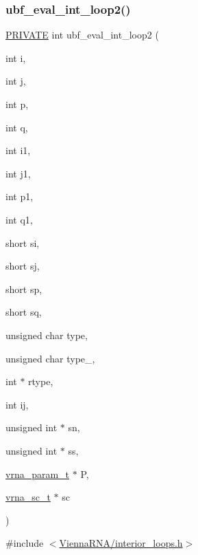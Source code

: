\subsubsection{\texorpdfstring{ubf\+\_\+eval\+\_\+int\+\_\+loop2()}{ubf\_eval\_int\_loop2()}}
{\footnotesize\ttfamily \mbox{\hyperlink{group__utils_ga5e151c615eda34903514212f05a5ccf8}{P\+R\+I\+V\+A\+TE}} int ubf\+\_\+eval\+\_\+int\+\_\+loop2 (\begin{DoxyParamCaption}\item[{int}]{i,  }\item[{int}]{j,  }\item[{int}]{p,  }\item[{int}]{q,  }\item[{int}]{i1,  }\item[{int}]{j1,  }\item[{int}]{p1,  }\item[{int}]{q1,  }\item[{short}]{si,  }\item[{short}]{sj,  }\item[{short}]{sp,  }\item[{short}]{sq,  }\item[{unsigned char}]{type,  }\item[{unsigned char}]{type\+\_,  }\item[{int $\ast$}]{rtype,  }\item[{int}]{ij,  }\item[{unsigned int $\ast$}]{sn,  }\item[{unsigned int $\ast$}]{ss,  }\item[{\mbox{\hyperlink{group__energy__parameters_ga8a69ca7d787e4fd6079914f5343a1f35}{vrna\+\_\+param\+\_\+t}} $\ast$}]{P,  }\item[{\mbox{\hyperlink{group__soft__constraints_ga75401ce219ef8dbcceb672db82d434c6}{vrna\+\_\+sc\+\_\+t}} $\ast$}]{sc }\end{DoxyParamCaption})}



{\ttfamily \#include $<$\mbox{\hyperlink{interior__loops_8h}{Vienna\+R\+N\+A/interior\+\_\+loops.\+h}}$>$}

\mbox{\label{group__loops_ga0f0ba96735be7e218bed5db4746012fd}} 
